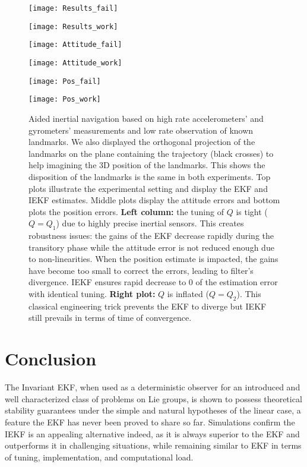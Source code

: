 \documentclass[a4paper,12pt,onecolumn]{article}
\begin{document}
\begin{figure*}[!h]
  \centering
\begin{minipage}[b][]{0.44\linewidth}\noindent
\texttt{[image: Results\_fail]}
\end{minipage}
\begin{minipage}[b][]{0.44\linewidth}\noindent
\texttt{[image: Results\_work]}
\end{minipage}
\begin{minipage}[b][]{0.44\linewidth}
\texttt{[image: Attitude\_fail]}
\end{minipage}
\begin{minipage}[b][]{0.44\linewidth}
\texttt{[image: Attitude\_work]}
\end{minipage}
\begin{minipage}[b][]{0.44\linewidth}\noindent
\texttt{[image: Pos\_fail]}
\end{minipage}
\begin{minipage}[b][]{0.44\linewidth}\noindent
\texttt{[image: Pos\_work]}
\end{minipage}
  \caption{Aided inertial navigation based on high rate accelerometers' and gyrometers' measurements and low rate observation of known landmarks. We also displayed the orthogonal projection of the landmarks on the plane containing the trajectory (black crosses) to help imagining the 3D position of the landmarks. This shows the disposition of the landmarks is the same in both experiments. Top plots illustrate the experimental setting and display the  EKF and IEKF estimates. Middle plots display the attitude errors and bottom plots the position errors. \textbf{Left column:} the tuning of $Q$ is tight ($Q=Q_1$) due to highly precise inertial sensors. This creates robustness issues: the gains of the EKF decrease rapidly during the transitory phase while the attitude error is not reduced enough due to non-linearities. When the position estimate is impacted, the gains have become too small to correct the errors, leading to filter's divergence. IEKF ensures rapid decrease to 0 of the estimation error with identical tuning. \textbf{Right plot:}   $Q$ is inflated ($Q=Q_2$). This classical engineering trick prevents the EKF to diverge but IEKF still prevails in terms of time of convergence.}
\label{fig::Simu_3D}
\end{figure*}


\section{Conclusion}
The Invariant EKF, when used as a deterministic observer for an introduced and well characterized class of problems on Lie groups, is shown to possess theoretical stability guarantees under the simple and natural hypotheses of the linear case, a feature the EKF has never been proved to share so far. Simulations confirm the   IEKF is an appealing alternative indeed, as it is always superior to the EKF and  outperforms it in challenging situations, while remaining similar to EKF in terms of tuning, implementation, and computational load. 
\end{document}
